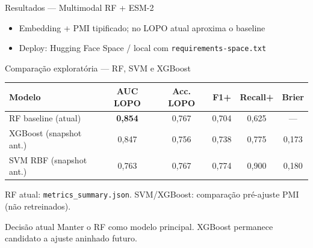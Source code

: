 \documentclass[aspectratio=169,10pt]{beamer}
\begin{document}
\begin{frame}{Resultados --- Multimodal RF + ESM-2}
\begin{center}
\end{center}
\vspace{0.35cm}
\begin{itemize}
  \item Embedding + PMI tipificado; no LOPO atual aproxima o baseline
  \item Deploy: Hugging Face Space / local com \texttt{requirements-space.txt}
\end{itemize}
\end{frame}

\begin{frame}{Comparação exploratória --- RF, SVM e XGBoost}
\begin{center}
\renewcommand{\arraystretch}{1.18}
{\small
\begin{tabular}{lccccc}
\toprule
\textbf{Modelo} & \textbf{AUC LOPO} & \textbf{Acc. LOPO} & \textbf{F1+} & \textbf{Recall+} & \textbf{Brier} \\
\midrule
RF baseline (atual) & \textbf{0,854} & 0,767 & 0,704 & 0,625 & --- \\
XGBoost (snapshot ant.) & 0,847 & 0,756 & 0,738 & 0,775 & 0,173 \\
SVM RBF (snapshot ant.) & 0,763 & 0,767 & 0,774 & 0,900 & 0,180 \\
\bottomrule
\end{tabular}}
\end{center}
\vspace{0.15cm}
\begin{center}
{\scriptsize RF atual: \texttt{metrics\_summary.json}. SVM/XGBoost: comparação pré-ajuste PMI (não retreinados).}
\end{center}
\vspace{0.15cm}
\begin{block}{Decisão atual}
Manter o RF como modelo principal. XGBoost permanece candidato a ajuste aninhado futuro.
\end{block}
\end{frame}
\end{document}
